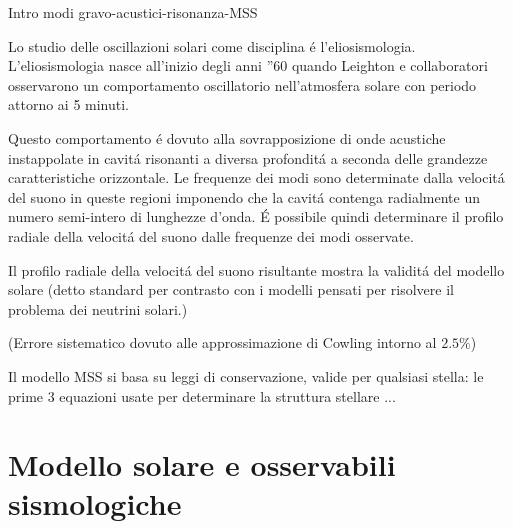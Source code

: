 \documentclass[10pt,xcolor={usenames},fleqn,mathserif,serif]{beamer}
\begin{document}
\begin{wordonframe}{Intro modi gravo-acustici-risonanza-MSS}

Lo studio delle oscillazioni solari come disciplina \'e l'eliosismologia. L'eliosismologia nasce all'inizio degli anni ''60 quando Leighton e collaboratori osservarono un comportamento oscillatorio nell'atmosfera solare con periodo attorno ai 5 minuti.

Questo comportamento \'e dovuto alla sovrapposizione di onde acustiche instappolate in cavit\'a risonanti a diversa profondit\'a a seconda delle grandezze caratteristiche orizzontale. Le frequenze dei modi sono determinate dalla velocit\'a del suono in queste regioni imponendo che  la cavit\'a contenga radialmente un numero semi-intero di lunghezze d'onda. \'E possibile quindi determinare il profilo radiale della velocit\'a del suono dalle frequenze dei modi osservate.

Il profilo radiale della velocit\'a del suono risultante  mostra la validit\'a del modello solare (detto standard per contrasto con i modelli pensati per risolvere il problema dei neutrini solari.)

(Errore sistematico dovuto alle approssimazione di Cowling intorno al $2.5\%$)

Il modello MSS si basa su leggi di conservazione, valide per qualsiasi stella: le prime 3 equazioni usate per determinare la struttura stellare ...

\end{wordonframe}

\part{Modello solare e osservabili sismologiche}\label{part:MSS}
\frame{\partpage}



\end{document}
